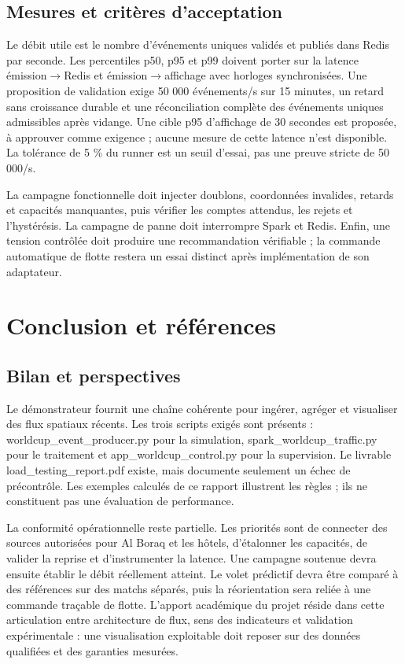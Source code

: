 \documentclass[a4paper,11pt]{article}
\begin{document}
\subsection{Mesures et critères d'acceptation}
Le débit utile est le nombre d'événements uniques validés et publiés dans Redis par seconde. Les percentiles p50, p95 et p99 doivent porter sur la latence émission\(\rightarrow\)Redis et émission\(\rightarrow\)affichage avec horloges synchronisées. Une proposition de validation exige 50 000 événements/s sur 15 minutes, un retard sans croissance durable et une réconciliation complète des événements uniques admissibles après vidange. Une cible p95 d'affichage de 30 secondes est proposée, à approuver comme exigence ; aucune mesure de cette latence n'est disponible. La tolérance de 5 \% du runner est un seuil d'essai, pas une preuve stricte de 50 000/s.
\par
La campagne fonctionnelle doit injecter doublons, coordonnées invalides, retards et capacités manquantes, puis vérifier les comptes attendus, les rejets et l'hystérésis. La campagne de panne doit interrompre Spark et Redis. Enfin, une tension contrôlée doit produire une recommandation vérifiable ; la commande automatique de flotte restera un essai distinct après implémentation de son adaptateur.
\par

\clearpage
\section{Conclusion et références}\label{sec:9}
\subsection{Bilan et perspectives}
Le démonstrateur fournit une chaîne cohérente pour ingérer, agréger et visualiser des flux spatiaux récents. Les trois scripts exigés sont présents : {\small\ttfamily worldcup\_\allowbreak{}event\_\allowbreak{}producer.\allowbreak{}py} pour la simulation, {\small\ttfamily spark\_\allowbreak{}worldcup\_\allowbreak{}traffic.\allowbreak{}py} pour le traitement et {\small\ttfamily app\_\allowbreak{}worldcup\_\allowbreak{}control.\allowbreak{}py} pour la supervision. Le livrable {\small\ttfamily load\_\allowbreak{}testing\_\allowbreak{}report.\allowbreak{}pdf} existe, mais documente seulement un échec de précontrôle. Les exemples calculés de ce rapport illustrent les règles ; ils ne constituent pas une évaluation de performance.
\par
La conformité opérationnelle reste partielle. Les priorités sont de connecter des sources autorisées pour Al Boraq et les hôtels, d'étalonner les capacités, de valider la reprise et d'instrumenter la latence. Une campagne soutenue devra ensuite établir le débit réellement atteint. Le volet prédictif devra être comparé à des références sur des matchs séparés, puis la réorientation sera reliée à une commande traçable de flotte. L'apport académique du projet réside dans cette articulation entre architecture de flux, sens des indicateurs et validation expérimentale : une visualisation exploitable doit reposer sur des données qualifiées et des garanties mesurées.
\par
\end{document}
